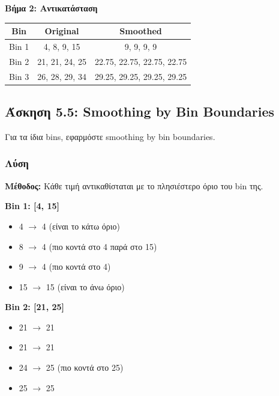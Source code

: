 \textbf{Βήμα 2: Αντικατάσταση}

\begin{center}
\begin{tabular}{ccc}
\toprule
\textbf{Bin} & \textbf{Original} & \textbf{Smoothed} \\
\midrule
Bin 1 & 4, 8, 9, 15 & 9, 9, 9, 9 \\
Bin 2 & 21, 21, 24, 25 & 22.75, 22.75, 22.75, 22.75 \\
Bin 3 & 26, 28, 29, 34 & 29.25, 29.25, 29.25, 29.25 \\
\bottomrule
\end{tabular}
\end{center}

\subsection{Άσκηση 5.5: Smoothing by Bin Boundaries}

\begin{formulabox}[Εκφώνηση]
Για τα ίδια bins, εφαρμόστε smoothing by bin boundaries.
\end{formulabox}

\subsubsection*{Λύση}

\textbf{Μέθοδος:} Κάθε τιμή αντικαθίσταται με το πλησιέστερο όριο του bin της.

\textbf{Bin 1: [4, 15]}
\begin{itemize}
    \item 4 $\to$ 4 (είναι το κάτω όριο)
    \item 8 $\to$ 4 (πιο κοντά στο 4 παρά στο 15)
    \item 9 $\to$ 4 (πιο κοντά στο 4)
    \item 15 $\to$ 15 (είναι το άνω όριο)
\end{itemize}

\textbf{Bin 2: [21, 25]}
\begin{itemize}
    \item 21 $\to$ 21
    \item 21 $\to$ 21
    \item 24 $\to$ 25 (πιο κοντά στο 25)
    \item 25 $\to$ 25
\end{itemize}

